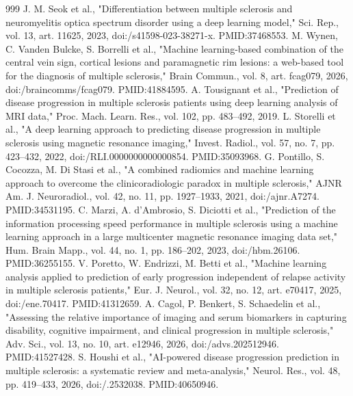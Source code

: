 \documentclass[journal,twoside,web]{ieeecolor}
\begin{document}
\begin{thebibliography}{999}
 J. M. Seok et al., "Differentiation between multiple sclerosis and neuromyelitis optica spectrum disorder using a deep learning model," Sci. Rep., vol. 13, art. 11625, 2023, doi:/\allowbreak s41598-023-38271-x. PMID:37468553.
 M. Wynen, C. Vanden Bulcke, S. Borrelli et al., "Machine learning-based combination of the central vein sign, cortical lesions and paramagnetic rim lesions: a web-based tool for the diagnosis of multiple sclerosis," Brain Commun., vol. 8, art. fcag079, 2026, doi:/\allowbreak braincomms/\allowbreak fcag079. PMID:41884595.
 A. Tousignant et al., "Prediction of disease progression in multiple sclerosis patients using deep learning analysis of MRI data," Proc. Mach. Learn. Res., vol. 102, pp. 483--492, 2019.
 L. Storelli et al., "A deep learning approach to predicting disease progression in multiple sclerosis using magnetic resonance imaging," Invest. Radiol., vol. 57, no. 7, pp. 423--432, 2022, doi:/\allowbreak RLI.0000000000000854. PMID:35093968.
 G. Pontillo, S. Cocozza, M. Di Stasi et al., "A combined radiomics and machine learning approach to overcome the clinicoradiologic paradox in multiple sclerosis," AJNR Am. J. Neuroradiol., vol. 42, no. 11, pp. 1927--1933, 2021, doi:/\allowbreak ajnr.A7274. PMID:34531195.
 C. Marzi, A. d'Ambrosio, S. Diciotti et al., "Prediction of the information processing speed performance in multiple sclerosis using a machine learning approach in a large multicenter magnetic resonance imaging data set," Hum. Brain Mapp., vol. 44, no. 1, pp. 186--202, 2023, doi:/\allowbreak hbm.26106. PMID:36255155.
 V. Poretto, W. Endrizzi, M. Betti et al., "Machine learning analysis applied to prediction of early progression independent of relapse activity in multiple sclerosis patients," Eur. J. Neurol., vol. 32, no. 12, art. e70417, 2025, doi:/\allowbreak ene.70417. PMID:41312659.
 A. Cagol, P. Benkert, S. Schaedelin et al., "Assessing the relative importance of imaging and serum biomarkers in capturing disability, cognitive impairment, and clinical progression in multiple sclerosis," Adv. Sci., vol. 13, no. 10, art. e12946, 2026, doi:/\allowbreak advs.202512946. PMID:41527428.
 S. Houshi et al., "AI-powered disease progression prediction in multiple sclerosis: a systematic review and meta-analysis," Neurol. Res., vol. 48, pp. 419--433, 2026, doi:/.2532038. PMID:40650946.

\end{thebibliography}
\end{document}
